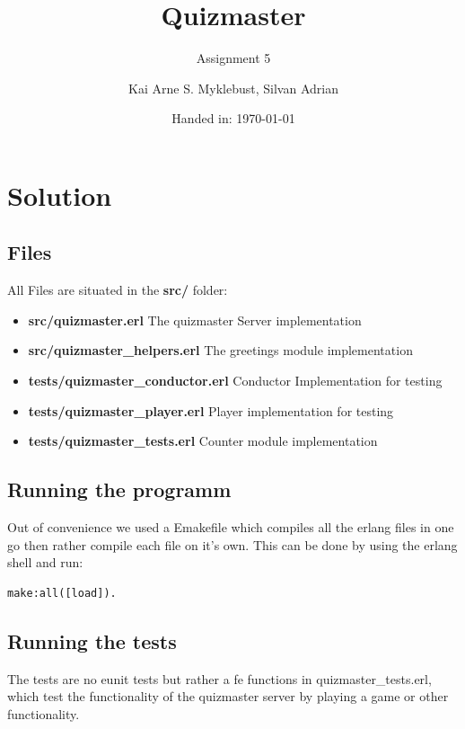 \documentclass[12pt,a4paper]{article}
\begin{document}
\title{Quizmaster}
\subtitle{Assignment 5}

\author{Kai Arne S. Myklebust, Silvan Adrian}
\date{Handed in: \today}
	
\maketitle
\tableofcontents

\section{Solution}

\subsection{Files}
All Files are situated in the \textbf{src/} folder:
\begin{itemize}
	\item \textbf{src/quizmaster.erl} The quizmaster Server implementation
	\item \textbf{src/quizmaster\_helpers.erl} The greetings module implementation
	\item \textbf{tests/quizmaster\_conductor.erl} Conductor Implementation for testing
	\item \textbf{tests/quizmaster\_player.erl} Player implementation for testing
	\item \textbf{tests/quizmaster\_tests.erl} Counter module implementation
\end{itemize}

\subsection{Running the programm}
Out of convenience we used a Emakefile which compiles all the erlang files in one go then rather compile each file on it's own.
This can be done by using the erlang shell and run:

\begin{verbatim}
make:all([load]).
\end{verbatim}

\subsection{Running the tests}
The tests are no eunit tests but rather a fe functions in quizmaster\_tests.erl, which test the functionality of the quizmaster server by playing a game or other functionality.
\end{document}
